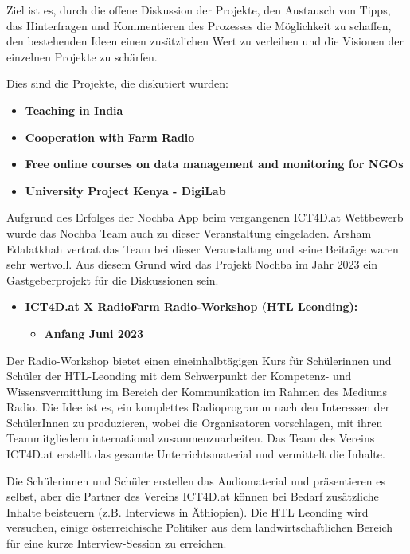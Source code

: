 Ziel ist es, durch die offene Diskussion der Projekte, den Austausch von Tipps, das Hinterfragen und Kommentieren des Prozesses die Möglichkeit zu schaffen, den bestehenden Ideen einen zusätzlichen Wert zu verleihen und die Visionen der einzelnen Projekte zu schärfen. 

Dies sind die Projekte, die diskutiert wurden:

\begin{itemize}
    \item \textbf{Teaching in India}
    \item \textbf{Cooperation with Farm Radio}
    \item \textbf{Free online courses on data management and monitoring for NGOs}
    \item \textbf{University Project Kenya - DigiLab}
\end{itemize}

Aufgrund des Erfolges der Nochba App beim vergangenen ICT4D.at Wettbewerb wurde das Nochba Team auch zu dieser Veranstaltung eingeladen. Arsham Edalatkhah vertrat das Team bei dieser Veranstaltung und seine Beiträge waren sehr wertvoll. Aus diesem Grund wird das Projekt Nochba im Jahr 2023 ein Gastgeberprojekt für die Diskussionen sein.

\begin{itemize}
    \item \textbf{ICT4D.at X RadioFarm Radio-Workshop (HTL Leonding):}
    \begin{itemize}
        \item \textbf{Anfang Juni 2023}
    \end{itemize}
\end{itemize}


Der Radio-Workshop bietet einen eineinhalbtägigen Kurs für Schülerinnen und Schüler der HTL-Leonding mit dem Schwerpunkt der Kompetenz- und Wissensvermittlung im Bereich der Kommunikation im Rahmen des Mediums Radio. Die Idee ist es, ein komplettes Radioprogramm nach den Interessen der SchülerInnen zu produzieren, wobei die Organisatoren vorschlagen, mit ihren Teammitgliedern international zusammenzuarbeiten. Das Team des Vereins ICT4D.at erstellt das gesamte Unterrichtsmaterial und vermittelt die Inhalte. 

Die Schülerinnen und Schüler erstellen das Audiomaterial und präsentieren es selbst, aber die Partner des Vereins ICT4D.at können bei Bedarf zusätzliche Inhalte beisteuern (z.B. Interviews in Äthiopien). Die HTL Leonding wird versuchen, einige österreichische Politiker aus dem landwirtschaftlichen Bereich für eine kurze Interview-Session zu erreichen.

